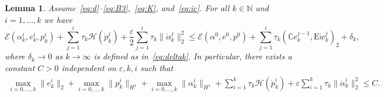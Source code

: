 \documentclass[reqno]{amsart}
\newtheorem{lemma}[corollary]{Lemma}
\theoremstyle{definition}
\numberwithin{equation}{section}
\def\N {\mathbb N}
\def\C {\mathbb C}
\def\EE {\mathrm{E}}
\begin{document}
\begin{lemma}
Assume~\eqref{eq:d}--\eqref{eq:B3},~\eqref{eq:K}, and~\eqref{eq:ic}. For all $k\in \N$ and $i=1,\dots,k$ we have
\begin{equation*}
\mathcal E(\alpha_k^i,e_k^i,p_k^i)+\sum_{j=1}^i\tau_k\mathcal H(\dot p_k^j)+\frac{\varepsilon}{2}\sum_{j=1}^i\tau_k\|\dot\alpha_k^j\|_2^2\le \mathcal E(\alpha^0,e^0,p^0)+\sum_{j=1}^i\tau_k(\C e_k^{j-1},\EE \dot w_k^j)_2+\delta_k,
\end{equation*}
where $\delta_k\to 0$ as $k\to\infty$ is defined as in~\eqref{eq:deltak}. In particular, there exists a constant $C>0$ independent on $\varepsilon,k,i$ such that
\begin{align}\label{eq:unif-est-eps}
\max_{i=0,\dots,k}\|e_k^i\|_2+\max_{i=0,\dots,k}\|p_k^i\|_{H^1}+\max_{i=0,\dots,k}\|\alpha_k^i\|_{H^1}+\sum_{i=1}^k\tau_k\mathcal H(\dot p_k^i)+\varepsilon \sum_{i=1}^k\tau_k\|\dot \alpha_k^i\|_2^2\le C.
\end{align}
\end{lemma}
\end{document}
